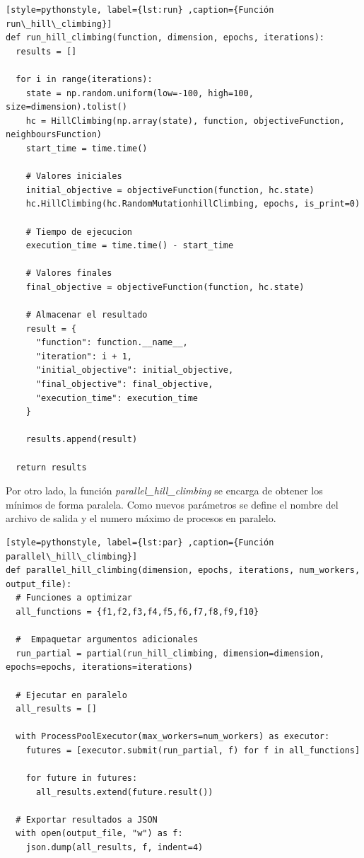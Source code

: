 \documentclass[12pt,twoside]{article}
\begin{document}
\begin{lstlisting}[style=pythonstyle, label={lst:run} ,caption={Función run\_hill\_climbing}]
def run_hill_climbing(function, dimension, epochs, iterations):
  results = []

  for i in range(iterations):
    state = np.random.uniform(low=-100, high=100, size=dimension).tolist()
    hc = HillClimbing(np.array(state), function, objectiveFunction, neighboursFunction)
    start_time = time.time()

    # Valores iniciales
    initial_objective = objectiveFunction(function, hc.state)
    hc.HillClimbing(hc.RandomMutationhillClimbing, epochs, is_print=0)

    # Tiempo de ejecucion    
    execution_time = time.time() - start_time

    # Valores finales
    final_objective = objectiveFunction(function, hc.state)

    # Almacenar el resultado
    result = {
	  "function": function.__name__,
	  "iteration": i + 1,
	  "initial_objective": initial_objective,
	  "final_objective": final_objective,
	  "execution_time": execution_time  
    }

    results.append(result)

  return results
\end{lstlisting}

Por otro lado, la función \textit{parallel\_hill\_climbing} se encarga de obtener los mínimos de forma paralela. Como nuevos parámetros se define el nombre del archivo de salida y el numero máximo de procesos en paralelo.

\begin{lstlisting}[style=pythonstyle, label={lst:par} ,caption={Función parallel\_hill\_climbing}]
def parallel_hill_climbing(dimension, epochs, iterations, num_workers, output_file):
  # Funciones a optimizar
  all_functions = {f1,f2,f3,f4,f5,f6,f7,f8,f9,f10}

  #  Empaquetar argumentos adicionales
  run_partial = partial(run_hill_climbing, dimension=dimension, epochs=epochs, iterations=iterations)

  # Ejecutar en paralelo
  all_results = []

  with ProcessPoolExecutor(max_workers=num_workers) as executor:
    futures = [executor.submit(run_partial, f) for f in all_functions]

    for future in futures:
      all_results.extend(future.result())

  # Exportar resultados a JSON
  with open(output_file, "w") as f:
    json.dump(all_results, f, indent=4)
\end{lstlisting}
\end{document}
